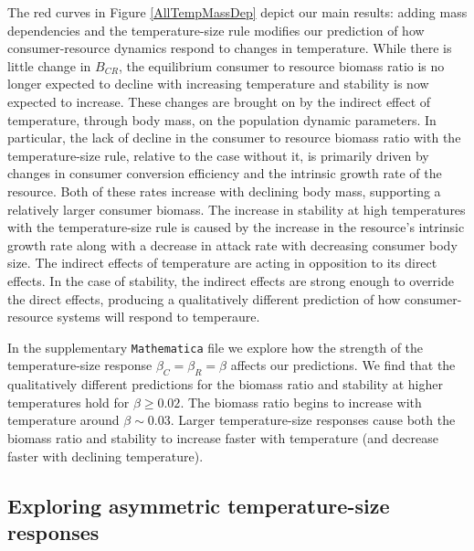 \documentclass[11pt]{article}
\begin{document}
The red curves in Figure \ref{AllTempMassDep} depict our main results: adding mass dependencies and the temperature-size rule modifies our prediction of how consumer-resource dynamics respond to changes in temperature.
While there is little change in $B_{CR}$, the equilibrium consumer to resource biomass ratio is no longer expected to decline with increasing temperature and stability is now expected to increase.
These changes are brought on by the indirect effect of temperature, through body mass, on the population dynamic parameters.
In particular, the lack of decline in the consumer to resource biomass ratio with the temperature-size rule, relative to the case without it, is primarily driven by changes in consumer conversion efficiency and the intrinsic growth rate of the resource.
Both of these rates increase with declining body mass, supporting a relatively larger consumer biomass. 
The increase in stability at high temperatures with the temperature-size rule is caused by the increase in the resource's intrinsic growth rate along with a decrease in attack rate with decreasing consumer body size. 
The indirect effects of temperature are acting in opposition to its direct effects.
In the case of stability, the indirect effects are strong enough to override the direct effects, producing a qualitatively different prediction of how consumer-resource systems will respond to temperaure.

In the supplementary \texttt{Mathematica} file we explore how the strength of the temperature-size response $\beta_C = \beta_R = \beta$ affects our predictions. 
We find that the qualitatively different predictions for the biomass ratio and stability at higher temperatures hold for $\beta\geq0.02$.
The biomass ratio begins to increase with temperature around $\beta\sim0.03$.
Larger temperature-size responses cause both the biomass ratio and stability to increase faster with temperature (and decrease faster with declining temperature).

\subsection*{Exploring asymmetric temperature-size responses}
\end{document}
